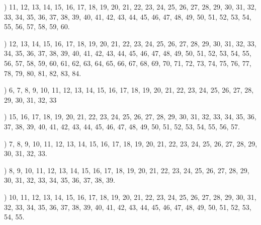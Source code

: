 \documentclass[a4paper,11pt]{article}
\begin{document}
\vspace{\spaceFour}



\noindent
{}) 11, 12, 13, 14, 15, 16, 17, 18, 19, 20, 21, 22, 23,
24, 25, 26, 27, 28, 29, 30, 31, 32, 33, 34, 35, 36, 37, 38, 39, 40,
41, 42, 43, 44, 45, 46, 47, 48, 49, 50, 51, 52, 53, 54, 55, 56, 57,
58, 59, 60.

\vspace{\spaceFour}



\noindent
{}) 12, 13, 14, 15, 16, 17, 18, 19, 20, 21, 22, 23, 24,
25, 26, 27, 28, 29, 30, 31, 32, 33, 34, 35, 36, 37, 38, 39, 40, 41,
42, 43, 44, 45, 46, 47, 48, 49, 50, 51, 52, 53, 54, 55, 56, 57, 58,
59, 60, 61, 62, 63, 64, 65, 66, 67, 68, 69, 70, 71, 72, 73, 74, 75,
76, 77, 78, 79, 80, 81, 82, 83, 84.

\vspace{\spaceFour}



\noindent
{}) 6, 7, 8, 9, 10, 11, 12, 13, 14, 15, 16, 17, 18, 19,
20, 21, 22, 23, 24, 25, 26, 27, 28, 29, 30, 31, 32, 33

\vspace{\spaceFour}



\noindent
{}) 15, 16, 17, 18, 19, 20, 21, 22, 23, 24, 25, 26, 27,
28, 29, 30, 31, 32, 33, 34, 35, 36, 37, 38, 39, 40, 41, 42, 43, 44,
45, 46, 47, 48, 49, 50, 51, 52, 53, 54, 55, 56, 57.

\vspace{\spaceFour}



\noindent
{}) 7, 8, 9, 10, 11, 12, 13, 14, 15, 16, 17, 18, 19, 20,
21, 22, 23, 24, 25, 26, 27, 28, 29, 30, 31, 32, 33.

\vspace{\spaceFour}



\noindent
{}) 8, 9, 10, 11, 12, 13, 14, 15, 16, 17, 18, 19, 20, 21,
22, 23, 24, 25, 26, 27, 28, 29, 30, 31, 32, 33, 34, 35, 36, 37, 38, 39.

\vspace{\spaceFour}



\noindent
{}) 10, 11, 12, 13, 14, 15, 16, 17, 18, 19, 20, 21, 22,
23, 24, 25, 26, 27, 28, 29, 30, 31, 32, 33, 34, 35, 36, 37, 38, 39,
40, 41, 42, 43, 44, 45, 46, 47, 48, 49, 50, 51, 52, 53, 54, 55.
\end{document}
